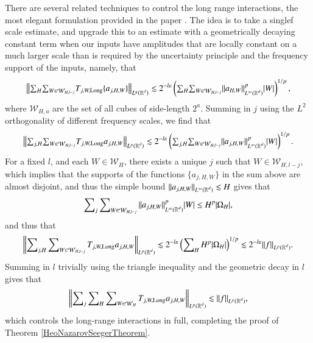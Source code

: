 There are several related techniques to control the long range interactions, the most elegant formulation provided in the paper \cite{HeoandNazarovandSeeger2}. The idea is to take a singlef scale estimate, and upgrade this to an estimate with a geometrically decaying constant term when our inputs have amplitudes that are locally constant on a much larger scale than is required by the uncertainty principle and the frequency support of the inputs, namely, that
%
\begin{equation}
  \left\| {\textstyle \sum\nolimits_H} {\textstyle \sum\nolimits_{W \in \mathcal{W}_{H,l-j}}} T_{j,W,\text{Long}} \{ a_{j,H,W} \} \right\|_{L^q(\operatorname{\mathbb{R}}^d)} \lesssim 2^{-l \varepsilon} \left( {\textstyle \sum\nolimits_H} {\textstyle \sum\nolimits_{W \in \mathcal{W}_{H,l-j}}} \| a_{H,W} \|_{L^\infty(\operatorname{\mathbb{R}}^d)}^p |W| \right)^{1/p},
\end{equation}
%
where $\mathcal{W}_{H,a}$ are the set of all cubes of side-length $2^a$. Summing in $j$ using the $L^2$ orthogonality of different frequency scales, we find that
%
\begin{equation}
  \left\| {\textstyle \sum\nolimits_{j,H}} {\textstyle \sum\nolimits_{W \in \mathcal{W}_{H,l-j}}} T_{j,W,\text{Long}} a_{j,H,W} \right\|_{L^p(\operatorname{\mathbb{R}}^d)} \lesssim 2^{-l \varepsilon} \left( {\textstyle \sum\nolimits_{j,H}} {\textstyle \sum\nolimits_{W \in \mathcal{W}_{H,l-j}}} \| a_{j,H,W} \|_{L^\infty(\operatorname{\mathbb{R}}^d)}^p |W| \right)^{1/p}.
\end{equation}
%
For a fixed $l$, and each $W \in \mathcal{W}_H$, there exists a unique $j$ such that $W \in \mathcal{W}_{H,l-j}$, which implies that the supports of the functions $\{ a_{j,H,W} \}$ in the sum above are almost disjoint, and thus the simple bound $\| a_{j,H,W} \|_{L^\infty(\operatorname{\mathbb{R}}^d)} \lesssim H$ gives that
%
\begin{equation}
  \sum\nolimits_j \sum\nolimits_{W \in \mathcal{W}_{H,l-j}} \| a_{j,H,W} \|_{L^\infty(\operatorname{\mathbb{R}}^d)}^p |W| \leq H^p |\Omega_H|,
\end{equation}
%
and thus that
%
\begin{equation}
  \left\| \sum\nolimits_{j,H} \sum\nolimits_{W \in \mathcal{W}_{H,l-j}} T_{j,W,\text{Long}} a_{j,H,W} \right\|_{L^p(\operatorname{\mathbb{R}}^d)} \lesssim 2^{-l \varepsilon} \left( \sum\nolimits_H H^p |\Omega_H| \right)^{1/p} \lesssim 2^{-l\varepsilon} \| f \|_{L^p(\operatorname{\mathbb{R}}^d)}.
\end{equation}
%
Summing in $l$ trivially using the triangle inequality and the geometric decay in $l$ gives that
%
\begin{equation}
  \left\| \sum\nolimits_j \sum\nolimits_H \sum\nolimits_{W \in \mathcal{W}_{H}} T_{j,W,\text{Long}} a_{j,H,W} \right\|_{L^p(\operatorname{\mathbb{R}}^d)} \lesssim \| f \|_{L^p(\operatorname{\mathbb{R}}^d)},
\end{equation}
%
which controls the long-range interactions in full, completing the proof of Theorem \ref{HeoNazarovSeegerTheorem}.

